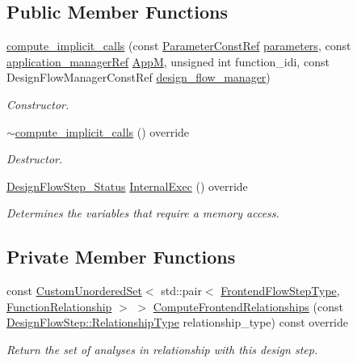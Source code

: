 \subsection*{Public Member Functions}
\begin{DoxyCompactItemize}
\item 
\hyperlink{classcompute__implicit__calls_a6e0a8827ed0c43ffae6b916deb1a57be}{compute\+\_\+implicit\+\_\+calls} (const \hyperlink{Parameter_8hpp_a37841774a6fcb479b597fdf8955eb4ea}{Parameter\+Const\+Ref} \hyperlink{classDesignFlowStep_a802eaafe8013df706370679d1a436949}{parameters}, const \hyperlink{application__manager_8hpp_a04ccad4e5ee401e8934306672082c180}{application\+\_\+manager\+Ref} \hyperlink{classFrontendFlowStep_a0ac0d8db2a378416583f51c4faa59d15}{AppM}, unsigned int function\+\_\+idi, const Design\+Flow\+Manager\+Const\+Ref \hyperlink{classDesignFlowStep_ab770677ddf087613add30024e16a5554}{design\+\_\+flow\+\_\+manager})
\begin{DoxyCompactList}\small\item\em Constructor. \end{DoxyCompactList}\item 
\hyperlink{classcompute__implicit__calls_aafe777edf1545793f29518008172930d}{$\sim$compute\+\_\+implicit\+\_\+calls} () override
\begin{DoxyCompactList}\small\item\em Destructor. \end{DoxyCompactList}\item 
\hyperlink{design__flow__step_8hpp_afb1f0d73069c26076b8d31dbc8ebecdf}{Design\+Flow\+Step\+\_\+\+Status} \hyperlink{classcompute__implicit__calls_ae2088a9a4859e68a380a05875901b9e3}{Internal\+Exec} () override
\begin{DoxyCompactList}\small\item\em Determines the variables that require a memory access. \end{DoxyCompactList}\end{DoxyCompactItemize}
\subsection*{Private Member Functions}
\begin{DoxyCompactItemize}
\item 
const \hyperlink{classCustomUnorderedSet}{Custom\+Unordered\+Set}$<$ std\+::pair$<$ \hyperlink{frontend__flow__step_8hpp_afeb3716c693d2b2e4ed3e6d04c3b63bb}{Frontend\+Flow\+Step\+Type}, \hyperlink{classFrontendFlowStep_af7cf30f2023e5b99e637dc2058289ab0}{Function\+Relationship} $>$ $>$ \hyperlink{classcompute__implicit__calls_a5b072707f48af9376c922af6479ffb0a}{Compute\+Frontend\+Relationships} (const \hyperlink{classDesignFlowStep_a723a3baf19ff2ceb77bc13e099d0b1b7}{Design\+Flow\+Step\+::\+Relationship\+Type} relationship\+\_\+type) const override
\begin{DoxyCompactList}\small\item\em Return the set of analyses in relationship with this design step. \end{DoxyCompactList}\end{DoxyCompactItemize}

